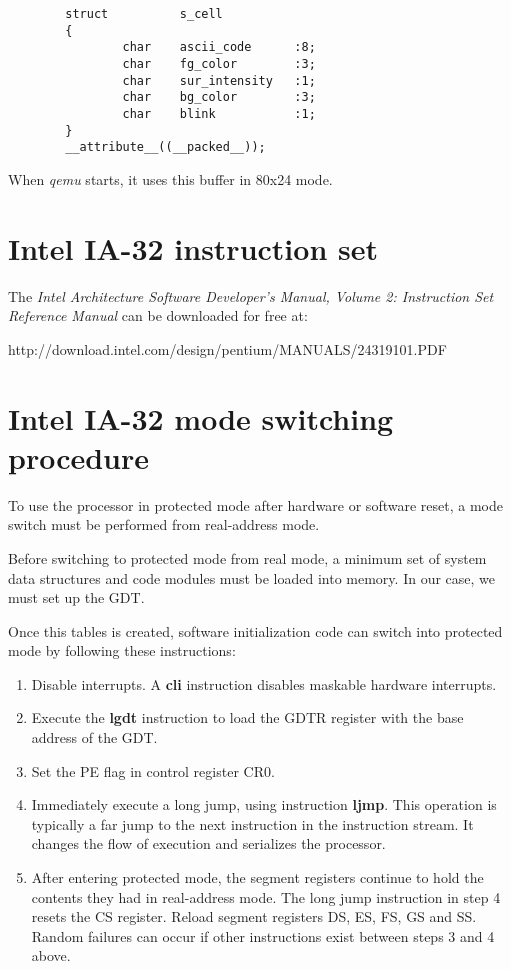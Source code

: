 \begin{verbatim}
        struct          s_cell
        {
                char    ascii_code      :8;
                char    fg_color        :3;
                char    sur_intensity   :1;
                char    bg_color        :3;
                char    blink           :1;
        }
        __attribute__((__packed__));
\end{verbatim}

When \emph{qemu} starts, it uses this buffer in 80x24 mode.

%
%

\newpage
\section{Intel IA-32 instruction set}

The  \emph{Intel Architecture Software Developer's Manual, Volume 2:
Instruction Set Reference Manual} can be downloaded for free at:

http://download.intel.com/design/pentium/MANUALS/24319101.PDF

\section{Intel IA-32 mode switching procedure}

To use the processor in protected mode after hardware or software reset, a mode
switch must be performed from real-address mode.

Before switching to protected mode from real mode, a minimum set of system data
structures and code modules must be loaded into memory. In our case, we must
set up the GDT.

Once this tables is created, software initialization code can switch into
protected mode by following these instructions:
\begin{enumerate}
  \item
    Disable interrupts. A \textbf{cli} instruction disables maskable
    hardware interrupts.
  \item
    Execute the \textbf{lgdt} instruction to load the GDTR register
    with the base address of the GDT.
  \item
    Set the PE flag in control register CR0.
  \item
    Immediately execute a long jump, using instruction \textbf{ljmp}.
    This operation is typically a far jump to the next instruction in the
    instruction stream. It changes the flow of execution and serializes the
    processor.
  \item
    After entering protected mode, the segment registers continue to
    hold the contents they had in real-address mode. The long jump instruction
    in step 4 resets the CS register. Reload segment registers DS, ES, FS, GS
    and SS. Random failures can occur if other instructions exist between
    steps 3 and 4 above.
\end{enumerate}
